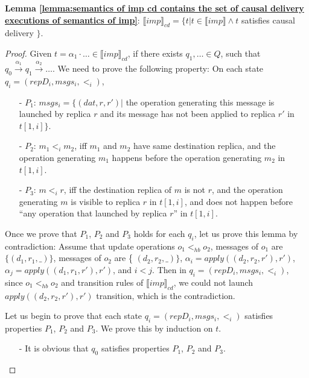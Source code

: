 {{\noindent \bf Lemma \ref{lemma:semantics of imp cd contains the set of causal delivery executions of semantics of imp}}: $\llbracket imp \rrbracket_{cd} = \{ t \vert t \in \llbracket imp \rrbracket \wedge t$ satisfies causal delivery $\}$.

\begin {proof}

Given $t = \alpha_1 \cdot \ldots \in \llbracket imp \rrbracket_{cd}$, if there exists $q_1,\ldots \in Q$, such that $q_0 {\xrightarrow{\alpha_1}} q_1 {\xrightarrow{\alpha_2}} \ldots$. We need to prove the following property: On each state $q_i=(repD_i,msgs_i,<_i)$,

\begin{itemize}
\setlength{\itemsep}{0.5pt}
\item[-] $P_1$: $msgs_i = \{ (dat,r,r') \vert$ the operation generating this message is launched by replica $r$ and its message has not been applied to replica $r'$ in $t[1,i]\}$.

\item[-] $P_2$: $m_1 <_i m_2$, iff $m_1$ and $m_2$ have same destination replica, and the operation generating $m_1$ happens before the operation generating $m_2$ in $t[1,i]$.

\item[-] $P_3$: $m <_i r$, iff the destination replica of $m$ is not $r$, and the operation generating $m$ is visible to replica $r$ in $t[1,i]$, and does not happen before ``any operation that launched by replica $r$'' in $t[1,i]$.
\end{itemize}

Once we prove that $P_1$, $P_2$ and $P_3$ holds for each $q_i$, let us prove this lemma by contradiction: Assume that update operations $o_1 <_{hb} o_2$, messages of $o_1$ are $\{ (d_1,r_1,\_) \}$, messages of $o_2$ are \{ $(d_2,r_2,\_) \}$, $\alpha_i = apply((d_2,r_2,r'),r')$, $\alpha_j = apply((d_1,r_1,r'),r')$, and $i<j$. Then in $q_i=(repD_i,msgs_i,<_i)$, since $o_1 <_{hb} o_2$ and transition rules of $\llbracket imp \rrbracket_{cd}$, we could not launch $apply((d_2,r_2,r'),r')$ transition, which is the contradiction.



Let us begin to prove that each state $q_i=(repD_i,msgs_i,<_i)$ satisfies properties $P_1$, $P_2$ and $P_3$. We prove this by induction on $t$.

\begin{itemize}
\setlength{\itemsep}{0.5pt}
\item[-] It is obvious that $q_0$ satisfies properties $P_1$, $P_2$ and $P_3$.


\end{itemize}
\end{proof}}
